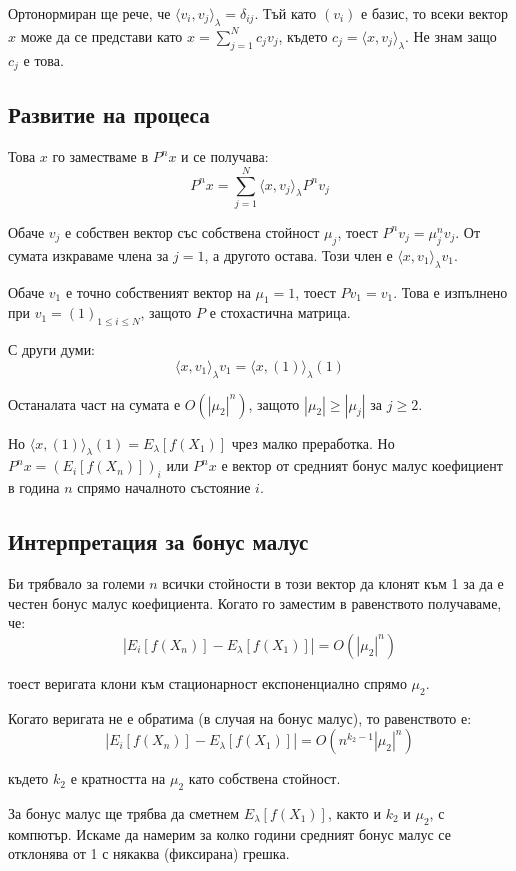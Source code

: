 \documentclass{article}
\begin{document}
Ортонормиран ще рече, че $\langle v_i,v_j \rangle_\lambda = \delta_{ij}$. Тъй като $(v_i)$ е базис, то всеки вектор $x$ може да се представи като $x = \sum_{j=1}^N c_j v_j$, където $c_j = \langle x,v_j \rangle_\lambda$. Не знам защо $c_j$ е това.

\subsection{Развитие на процеса}
Това $x$ го заместваме в $P^n x$ и се получава:
$$P^n x = \sum_{j=1}^N \langle x,v_j \rangle_\lambda P^n v_j$$

Обаче $v_j$ е собствен вектор със собствена стойност $\mu_j$, тоест $P^n v_j = \mu_j^n v_j$. От сумата изкраваме члена за $j=1$, а другото остава. Този член е $\langle x,v_1 \rangle_\lambda v_1$.

Обаче $v_1$ е точно собственият вектор на $\mu_1=1$, тоест $P v_1 = v_1$. Това е изпълнено при $v_1 = (1)_{1\leq i\leq N}$, защото $P$ е стохастична матрица.

С други думи:
$$\langle x,v_1 \rangle_\lambda v_1 = \langle x,(1) \rangle_\lambda (1)$$

Останалата част на сумата е $O(|\mu_2|^n)$, защото $|\mu_2| \geq |\mu_j|$ за $j\geq2$.

Но $\langle x,(1) \rangle_\lambda (1) = E_\lambda[f(X_1)]$ чрез малко преработка. Но $P^n x = (E_i[f(X_n)])_i$ или $P^n x$ е вектор от средният бонус малус коефициент в година $n$ спрямо началното състояние $i$.

\subsection{Интерпретация за бонус малус}
Би трябвало за големи $n$ всички стойности в този вектор да клонят към 1 за да е честен бонус малус коефициента. Когато го заместим в равенството получаваме, че:
$$|E_i[f(X_n)] - E_\lambda[f(X_1)]| = O(|\mu_2|^n)$$

тоест веригата клони към стационарност експоненциално спрямо $\mu_2$.

Когато веригата не е обратима (в случая на бонус малус), то равенството е:
$$|E_i[f(X_n)] - E_\lambda[f(X_1)]| = O(n^{k_2-1}|\mu_2|^n)$$

където $k_2$ е кратността на $\mu_2$ като собствена стойност.

За бонус малус ще трябва да сметнем $E_\lambda[f(X_1)]$, както и $k_2$ и $\mu_2$, с компютър. Искаме да намерим за колко години средният бонус малус се отклонява от 1 с някаква (фиксирана) грешка.
\end{document}
